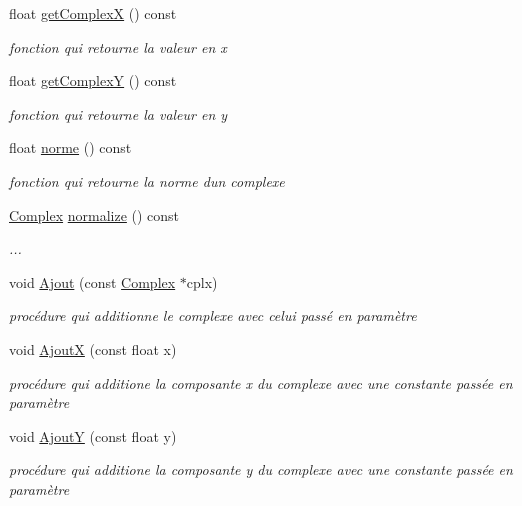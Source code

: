 \begin{DoxyCompactItemize}
float \hyperlink{classComplex_acbb1e195b5cf17f1234ad6e4d556d231}{get\+ComplexX} () const
\begin{DoxyCompactList}\small\item\em fonction qui retourne la valeur en x \end{DoxyCompactList}\item 
float \hyperlink{classComplex_ae94fc4f9008123778a6a6a012ca5059b}{get\+ComplexY} () const
\begin{DoxyCompactList}\small\item\em fonction qui retourne la valeur en y \end{DoxyCompactList}\item 
float \hyperlink{classComplex_a89cc3ed3da1f0365c64fc289f85417c2}{norme} () const
\begin{DoxyCompactList}\small\item\em fonction qui retourne la norme d\textquotesingle{}un complexe \end{DoxyCompactList}\item 
\hyperlink{classComplex}{Complex} \hyperlink{classComplex_abd979d452f329db5df473395b2dca65f}{normalize} () const
\begin{DoxyCompactList}\small\item\em ... \end{DoxyCompactList}\item 
void \hyperlink{classComplex_a77329ef019354c92b879b6e6ff081ece}{Ajout} (const \hyperlink{classComplex}{Complex} $\ast$cplx)
\begin{DoxyCompactList}\small\item\em procédure qui additionne le complexe avec celui passé en paramètre \end{DoxyCompactList}\item 
void \hyperlink{classComplex_a46b40fa2a1f237ea0d225d6128b6da50}{AjoutX} (const float x)
\begin{DoxyCompactList}\small\item\em procédure qui additione la composante x du complexe avec une constante passée en paramètre \end{DoxyCompactList}\item 
void \hyperlink{classComplex_a8bc2ed7cad179a8dad0d18f68450d6e4}{AjoutY} (const float y)
\begin{DoxyCompactList}\small\item\em procédure qui additione la composante y du complexe avec une constante passée en paramètre \end{DoxyCompactList}\item 

\end{DoxyCompactItemize}
